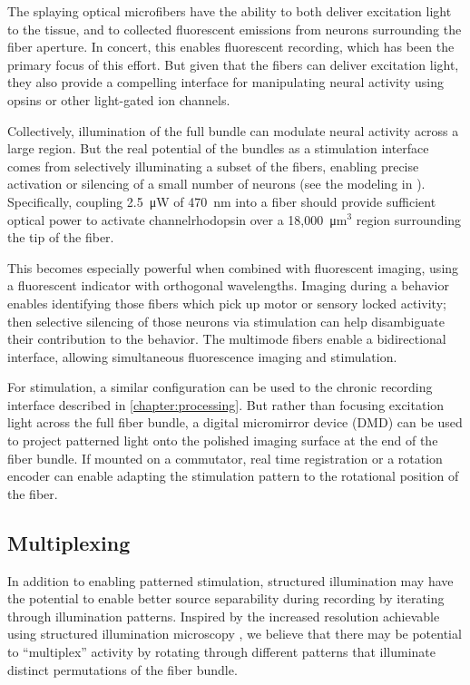 The splaying optical microfibers have the ability to 
both deliver excitation light to the tissue, and to 
collected fluorescent emissions from neurons 
surrounding the fiber aperture. In concert, this 
enables fluorescent recording, which has been the 
primary focus of this effort. But given that the 
fibers can deliver excitation light, they also 
provide a compelling interface for manipulating 
neural activity using opsins or other light-gated 
ion channels. 

Collectively, illumination of the full bundle can 
modulate neural activity across a large region. But 
the real potential of the bundles as a stimulation 
interface comes from selectively illuminating a 
subset of the fibers, enabling precise activation 
or silencing of a small number of neurons (see 
the modeling in ). 
Specifically, coupling 2.5~\si{\micro\watt} of 
470~nm into a fiber should provide sufficient 
optical power to activate channelrhodopsin over a 
18,000~\si{\micro\meter}$^3$ region surrounding 
the tip of the fiber.

This becomes especially powerful when combined 
with fluorescent imaging, using a fluorescent 
indicator with orthogonal wavelengths. Imaging 
during a behavior enables identifying those 
fibers which pick up motor or sensory locked 
activity; then selective silencing of those 
neurons via stimulation can help disambiguate 
their contribution to the behavior. The 
multimode fibers enable a bidirectional 
interface, allowing simultaneous fluorescence 
imaging and stimulation.

For stimulation, a similar configuration can be 
used to the chronic recording interface described 
in \cref{chapter:processing}. But rather than 
focusing excitation light across the full fiber  
bundle, a digital micromirror device (DMD) can be 
used to project patterned light onto the polished 
imaging surface at the end of the fiber bundle. 
If mounted on a commutator, real time registration 
or a rotation encoder can enable adapting the 
stimulation pattern to the rotational position of 
the fiber.

\subsection{Multiplexing}

In addition to enabling patterned stimulation, 
structured illumination may have the potential 
to enable better source separability during 
recording by iterating through illumination 
patterns. Inspired by the increased resolution 
achievable using structured illumination 
microscopy
\cite{Gustafsson:2000wj,Gustafsson:2005hg,Saxena:2015fm},
we believe that there may be potential 
to ``multiplex'' activity by rotating through 
different patterns that illuminate distinct 
permutations of the fiber bundle. 

